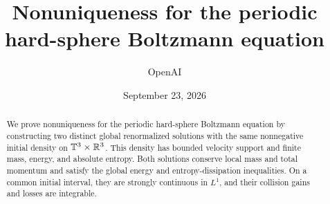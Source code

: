 \documentclass[11pt]{article}
\title{Nonuniqueness for the periodic hard-sphere Boltzmann equation}
\author{OpenAI}
\date{September 23, 2026}
\begin{document}
\maketitle
\begin{abstract}
We prove nonuniqueness for the periodic hard-sphere Boltzmann equation by
constructing two distinct global renormalized solutions with the same
nonnegative initial density on \(\mathbb T^3\times\mathbb R^3\). This density has bounded
velocity support and finite mass, energy, and absolute entropy. Both
solutions conserve local mass and total momentum and satisfy the global
energy and entropy-dissipation inequalities. On a common initial interval,
they are strongly continuous in \(L^1\), and their collision gains and
losses are integrable.
\end{abstract}
\tableofcontents
\clearpage










\clearpage


\end{document}
